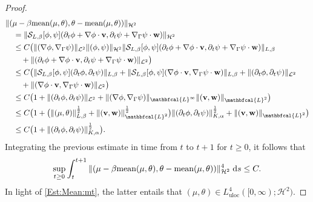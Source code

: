 \documentclass[10pt,reqno]{amsart}
\theoremstyle{remark}
\numberwithin{equation}{section}
\newcommand{\norm}[1]{\| #1 \|}
\newcommand{\scp}[2]{ ( #1 , #2  )}
\newcommand{\mean}[2]{\textnormal{mean}\scp{#1}{#2}}
\newcommand{\bv}{\mathbf{v}}
\newcommand{\bw}{\mathbf{w}}
\newcommand{\ds}{\;\mathrm ds}
\newcommand{\delt}{\partial_{t}}
\newcommand{\Grad}{\nabla}
\newcommand{\Gradg}{\nabla_\Ga}
\newcommand{\Ga}{\Gamma}
\begin{document}
\begin{proof}
    \begin{align*}
        &\norm{(\mu - \beta\mean{\mu}{\theta},\theta - \mean{\mu}{\theta})}_{\mathcal{H}^2} \nonumber \\
        &\quad = \norm{\mathcal{S}_{L,\beta}[\phi,\psi](\delt\phi + \Grad\phi\cdot\mathbf{v}, \delt\psi + \Gradg\psi\cdot\mathbf{w})}_{\mathcal{H}^2} \nonumber \\
        &\quad\leq C\big(\norm{(\Grad\phi,\Gradg\psi)}_{\mathcal{L}^2}\norm{(\phi,\psi)}_{\mathcal{H}^2}\norm{\mathcal{S}_{L,\beta}[\phi,\psi](\delt\phi + \Grad\phi\cdot\mathbf{v}, \delt\psi + \Gradg\psi\cdot\mathbf{w})}_{L,\beta} \nonumber \\
        &\qquad + \norm{(\delt\phi + \Grad\phi\cdot\mathbf{v}, \delt\psi + \Gradg\psi\cdot\mathbf{w})}_{\mathcal{L}^2}\big) \nonumber \\
        &\quad\leq C\big( \norm{\mathcal{S}_{L,\beta}[\phi,\psi](\delt\phi,\delt\psi)}_{L,\beta} + \norm{\mathcal{S}_{L,\beta}[\phi,\psi](\Grad\phi\cdot\mathbf{v},\Gradg\psi\cdot\mathbf{w})}_{L,\beta} + \norm{(\delt\phi,\delt\psi)}_{\mathcal{L}^2} \\
        &\qquad + \norm{(\Grad\phi\cdot\mathbf{v},\Gradg\psi\cdot\mathbf{w})}_{\mathcal{L}^2}\big) \nonumber \\
        &\quad\leq C\big(1 + \norm{(\delt\phi,\delt\psi)}_{\mathcal{L}^2} + \norm{(\Grad\phi,\Gradg\psi)}_{\mathbfcal{L}^\infty}\norm{(\mathbf{v},\mathbf{w})}_{\mathbfcal{L}^2}\big) \nonumber \\
        &\quad\leq C\big(1 + \big(\norm{(\mu,\theta)}_{L,\beta}^{\frac12} + \norm{(\bv,\bw)}_{\mathbfcal{L}^2}^{\frac12}\big)\norm{(\delt\phi,\delt\psi)}_{K,\alpha}^{\frac12} + \norm{(\mathbf{v},\mathbf{w})}_{\mathbfcal{L}^2}\big) \nonumber \\
        &\quad\leq C\big(1 + \norm{(\delt\phi,\delt\psi)}_{K,\alpha}^{\frac12}\big). \nonumber
    \end{align*}
    Integrating the previous estimate in time from $t$ to $t+1$ for $t\geq 0$, it follows that
    \begin{align}\label{Est:HighReg:MT:H^2}
        \sup_{t\geq0}\int_t^{t+1}\norm{(\mu - \beta\mean{\mu}{\theta},\theta - \mean{\mu}{\theta})}_{\mathcal{H}^2}^4\ds \leq C.
    \end{align}
    In light of \eqref{Est:Mean:mt}, the latter entails that $(\mu,\theta)\in L^4_{\mathrm{uloc}}([0,\infty);\mathcal{H}^2)$. 



\end{proof}
\end{document}
